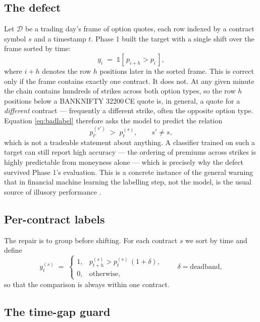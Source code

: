 \documentclass[11pt,a4paper]{article}
\begin{document}
\subsection{The defect}

Let $\mathcal{D}$ be a trading day's frame of option quotes, each row indexed by a
contract symbol $s$ and a timestamp $t$. Phase 1 built the target with a single shift
over the frame sorted by time:
\begin{equation}
y_i \;=\; \mathbb{1}\!\left[\, p_{i+h} > p_i \,\right],
\label{eq:badlabel}
\end{equation}
where $i+h$ denotes the row $h$ positions later in the sorted frame. This is correct
only if the frame contains exactly one contract. It does not. At any given minute the
chain contains hundreds of strikes across both option types, so the row $h$ positions
below a BANKNIFTY 32200\,CE quote is, in general, a quote for a \emph{different}
contract --- frequently a different strike, often the opposite option type. Equation
\eqref{eq:badlabel} therefore asks the model to predict the relation
\[
p^{(s')}_{t'} \;>\; p^{(s)}_{t},\qquad s' \neq s,
\]
which is not a tradeable statement about anything. A classifier trained on such a target
can still report high accuracy --- the ordering of premiums across strikes is highly
predictable from moneyness alone --- which is precisely why the defect survived
Phase 1's evaluation. This is a concrete instance of the general warning that in
financial machine learning the labelling step, not the model, is the usual source of
illusory performance \cite{lopezdeprado}.

\subsection{Per-contract labels}

The repair is to group before shifting. For each contract $s$ we sort by time and define
\begin{equation}
y^{(s)}_t \;=\;
\begin{cases}
1, & p^{(s)}_{t+h} > p^{(s)}_{t}\,(1+\delta),\\[2pt]
0, & \text{otherwise,}
\end{cases}
\qquad \delta = \text{deadband},
\label{eq:goodlabel}
\end{equation}
so that the comparison is always within one contract.

\subsection{The time-gap guard}
\end{document}
